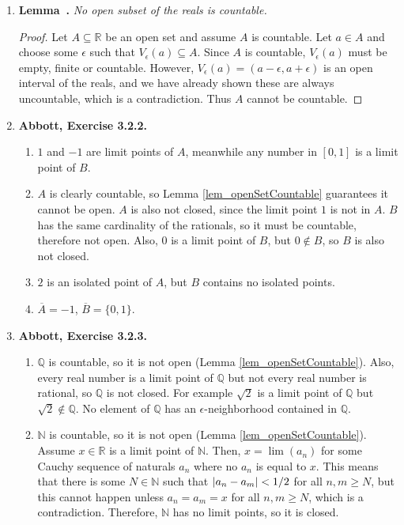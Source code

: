 \documentclass{article}
\newcounter{lemmaCounter}
\newenvironment{shortlemma}{\refstepcounter{lemmaCounter}
\noindent\textbf{Lemma~\thelemmaCounter.}\em}
\DeclarePairedDelimiter\abs{\lvert}{\rvert}
\newcommand{\N}{\mathbb{N}}
\newcommand{\Q}{\mathbb{Q}}
\newcommand{\R}{\mathbb{R}}
\newcommand{\set}[1]{\{#1\}}
\newcommand{\exc}[2][Abbott]{\item \textbf{#1, Exercise #2.}}
\begin{document}
\begin{enumerate}
    \item \begin{shortlemma} \label{lem_openSetCountable}
        No open subset of the reals is countable.
    \end{shortlemma}
    
    \begin{proof}
        Let $A \subseteq \R$ be an open set and assume $A$ is countable. Let $a \in A$ and choose some $\epsilon$ such that $V_\epsilon(a) \subseteq A$. Since $A$ is countable, $V_\epsilon(a)$ must be empty, finite or countable. However, $V_\epsilon(a) = (a-\epsilon, a+\epsilon)$ is an open interval of the reals, and we have already shown these are always uncountable, which is a contradiction. Thus $A$ cannot be countable.
    \end{proof}
    
    \exc{3.2.2}
    \begin{enumerate}
        \item $1$ and $-1$ are limit points of $A$, meanwhile any number in $[0, 1]$ is a limit point of $B$.
        
        \item $A$ is clearly countable, so Lemma \ref{lem_openSetCountable} guarantees it cannot be open. $A$ is also not closed, since the limit point $1$ is not in $A$. $B$ has the same cardinality of the rationals, so it must be countable, therefore not open. Also, $0$ is a limit point of $B$, but $0 \notin B$, so $B$ is also not closed.
        
        \item $2$ is an isolated point of $A$, but $B$ contains no isolated points.
        
        \item $\overline{A} = -1$, $\overline{B} = \set{0, 1}$.
    \end{enumerate}
    
    \exc{3.2.3}
    \begin{enumerate}
        \item $\Q$ is countable, so it is not open (Lemma \ref{lem_openSetCountable}). Also, every real number is a limit point of $\Q$ but not every real number is rational, so $\Q$ is not closed. For example $\sqrt{2}$ is a limit point of $\Q$ but $\sqrt{2} \notin \Q$. No element of $\Q$ has an $\epsilon$-neighborhood contained in $\Q$.
        
        \item $\N$ is countable, so it is not open (Lemma \ref{lem_openSetCountable}). Assume $x \in \R$ is a limit point of $\N$. Then, $x = \lim(a_n)$ for some Cauchy sequence of naturals $a_n$ where no $a_n$ is equal to $x$. This means that there is some $N \in \N$ such that $\abs*{a_n-a_m} < 1/2$ for all $n,m \geq N$, but this cannot happen unless $a_n = a_m = x$ for all $n,m \geq N$, which is a contradiction. Therefore, $\N$ has no limit points, so it is closed.
        

\end{enumerate}
\end{enumerate}
\end{document}
